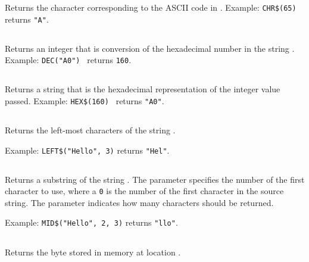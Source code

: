 \documentclass{report}
\begin{document}
    Returns the character corresponding to the ASCII code in .
    Example: \verb+CHR$(65)+ returns \verb+"A"+.   

    \subsection*{}

    Returns an integer that is conversion of the hexadecimal number in the string .
    Example: \verb+DEC("A0") + returns \verb+160+.

    \subsection*{}

    Returns a string that is the hexadecimal representation of the integer value passed.
    Example: \verb+HEX$(160) + returns \verb+"A0"+.

    \subsection*{}

    Returns the left-most  characters of the string .

    Example: \verb+LEFT$("Hello", 3)+ returns \verb+"Hel"+.   

    \subsection*{}

    Returns a substring of the string .
    The parameter  specifies the number of the first character to use, where
    a \verb+0+ is the number of the first character in the source string.
    The parameter  indicates how many characters should be returned.

    Example: \verb+MID$("Hello", 2, 3)+ returns \verb+"llo"+.

    \subsection*{}

    Returns the byte stored in memory at location .
\end{document}
